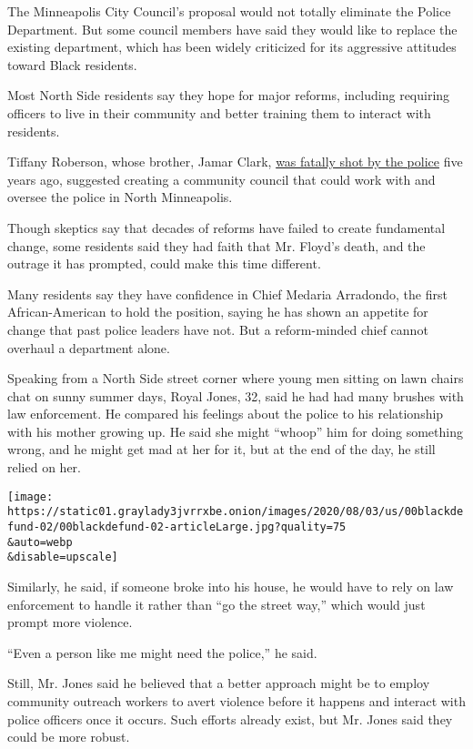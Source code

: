 The Minneapolis City Council's proposal would not totally eliminate the
Police Department. But some council members have said they would like to
replace the existing department, which has been widely criticized for
its aggressive attitudes toward Black residents.

Most North Side residents say they hope for major reforms, including
requiring officers to live in their community and better training them
to interact with residents.

Tiffany Roberson, whose brother, Jamar Clark,
\href{https://www.nytimes3xbfgragh.onion/2016/03/31/us/jamar-clark-shooting-minneapolis.html}{was
fatally shot by the police} five years ago, suggested creating a
community council that could work with and oversee the police in North
Minneapolis.

Though skeptics say that decades of reforms have failed to create
fundamental change, some residents said they had faith that Mr. Floyd's
death, and the outrage it has prompted, could make this time different.

Many residents say they have confidence in Chief Medaria Arradondo, the
first African-American to hold the position, saying he has shown an
appetite for change that past police leaders have not. But a
reform-minded chief cannot overhaul a department alone.

Speaking from a North Side street corner where young men sitting on lawn
chairs chat on sunny summer days, Royal Jones, 32, said he had had many
brushes with law enforcement. He compared his feelings about the police
to his relationship with his mother growing up. He said she might
``whoop'' him for doing something wrong, and he might get mad at her for
it, but at the end of the day, he still relied on her.

\texttt{[image: https://static01.graylady3jvrrxbe.onion/images/2020/08/03/us/00blackdefund-02/00blackdefund-02-articleLarge.jpg?quality=75\\\&auto=webp\\\&disable=upscale]}

Similarly, he said, if someone broke into his house, he would have to
rely on law enforcement to handle it rather than ``go the street way,''
which would just prompt more violence.

``Even a person like me might need the police,'' he said.

Still, Mr. Jones said he believed that a better approach might be to
employ community outreach workers to avert violence before it happens
and interact with police officers once it occurs. Such efforts already
exist, but Mr. Jones said they could be more robust.

